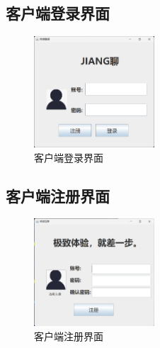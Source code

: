\documentclass[UTF8,12pt]{article}
\begin{document}
\subsection{客户端登录界面}
\begin{figure}[htbp]
    \centering
    \includegraphics[width=0.4\textwidth]{img/7.png}
    \caption{客户端登录界面}
\end{figure}

\subsection{客户端注册界面}
\begin{figure}[htbp]
    \centering
    \includegraphics[width=0.4\textwidth]{img/8.png}
    \caption{客户端注册界面}
\end{figure}
\end{document}
